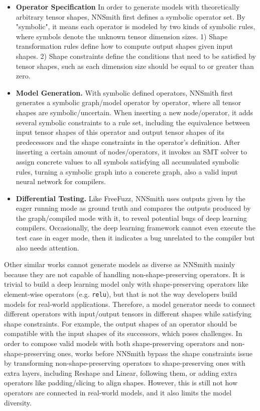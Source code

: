 \begin{survey}
\begin{itemize}
    \item \textbf{Operator Specification} In order to generate models with theoretically arbitrary tensor shapes, NNSmith first defines a symbolic operator set. By "symbolic", it means each operator is modeled by two kinds of symbolic rules, where symbols denote the unknown tensor dimension sizes. 1) Shape transformation rules define how to compute output shapes given input shapes. 2) Shape constraints define the conditions that need to be satisfied by tensor shapes, such as each dimension size should be equal to or greater than zero.
    \item \textbf{Model Generation.} With symbolic defined operators, NNSmith first generates a symbolic graph/model operator by operator, where all tensor shapes are symbolic/uncertain. When inserting a new node/operator, it adds several symbolic constraints to a rule set, including the equivalence between input tensor shapes of this operator and output tensor shapes of its predecessors and the shape constraints in the operator's definition. After inserting a certain amount of nodes/operators, it invokes an SMT solver to assign concrete values to all symbols satisfying all accumulated symbolic rules, turning a symbolic graph into a concrete graph, also a valid input neural network for compilers.
    \item \textbf{Differential Testing.} Like FreeFuzz, NNSmith uses outputs given by the eager running mode as ground truth and compares the outputs produced by the graph/compiled mode with it, to reveal potential bugs of deep learning compilers. Occasionally, the deep learning framework cannot even execute the test case in eager mode, then it indicates a bug unrelated to the compiler but also needs attention.
\end{itemize}

Other similar works\cite{cradle, lemon, graphfuzzer, muffin} cannot generate models as diverse as NNSmith mainly because they are not capable of handling non-shape-preserving operators. It is trivial to build a deep learning model only with shape-preserving operators like element-wise operators (e.g. \texttt{relu}), but that is not the way developers build models for real-world applications. Therefore, a model generator needs to connect different operators with input/output tensors in different shapes while satisfying shape constraints. For example, the output shapes of an operator should be compatible with the input shapes of its successors, which poses challenges. In order to compose valid models with both shape-preserving operators and non-shape-preserving ones, works before NNSmith bypass the shape constraints issue by transforming non-shape-preserving operators to shape-preserving ones with extra layers, including Reshape and Linear, following them\cite{muffin}, or adding extra operators like padding/slicing to align shapes\cite{graphfuzzer}. However, this is still not how operators are connected in real-world models, and it also limits the model diversity.


\end{survey}
